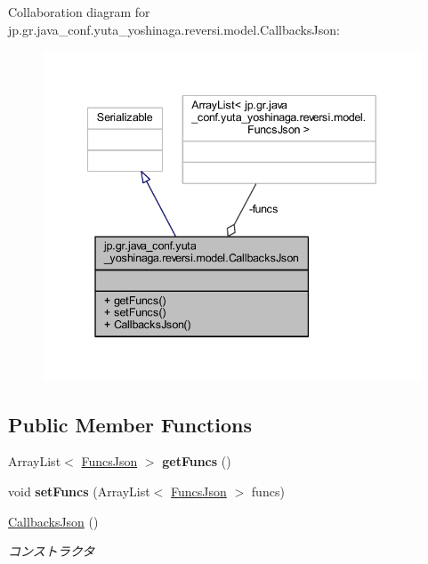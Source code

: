 Collaboration diagram for jp.\+gr.\+java\+\_\+conf.\+yuta\+\_\+yoshinaga.\+reversi.\+model.\+Callbacks\+Json\+:
\nopagebreak
\begin{figure}[H]
\begin{center}
\leavevmode
\includegraphics[width=340pt]{classjp_1_1gr_1_1java__conf_1_1yuta__yoshinaga_1_1reversi_1_1model_1_1_callbacks_json__coll__graph}
\end{center}
\end{figure}
\subsection*{Public Member Functions}
\begin{DoxyCompactItemize}
\item 
\mbox{\label{classjp_1_1gr_1_1java__conf_1_1yuta__yoshinaga_1_1reversi_1_1model_1_1_callbacks_json_a6a4392f70024df17cc70ca9b1869c2bd}} 
Array\+List$<$ \mbox{\hyperlink{classjp_1_1gr_1_1java__conf_1_1yuta__yoshinaga_1_1reversi_1_1model_1_1_funcs_json}{Funcs\+Json}} $>$ {\bfseries get\+Funcs} ()
\item 
\mbox{\label{classjp_1_1gr_1_1java__conf_1_1yuta__yoshinaga_1_1reversi_1_1model_1_1_callbacks_json_a2403240afdd5c32773aea65450b41b15}} 
void {\bfseries set\+Funcs} (Array\+List$<$ \mbox{\hyperlink{classjp_1_1gr_1_1java__conf_1_1yuta__yoshinaga_1_1reversi_1_1model_1_1_funcs_json}{Funcs\+Json}} $>$ funcs)
\item 
\mbox{\hyperlink{classjp_1_1gr_1_1java__conf_1_1yuta__yoshinaga_1_1reversi_1_1model_1_1_callbacks_json_acdc36faba755660c46ab3d1641d18e67}{Callbacks\+Json}} ()
\begin{DoxyCompactList}\small\item\em コンストラクタ \end{DoxyCompactList}\end{DoxyCompactItemize}
